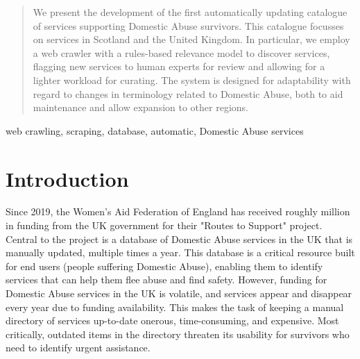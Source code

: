 \documentclass[conference]{IEEEtran}
\begin{document}

\maketitle

\begin{abstract}
We present the development of the first automatically updating catalogue of services supporting Domestic Abuse survivors. 
This catalogue focusses on services in Scotland and the United Kingdom. 
In particular, we employ a web crawler with a rules-based relevance model to discover services, flagging new services to human experts for review and allowing for a lighter workload for curating.
The system is designed for adaptability with regard to changes in terminology related to Domestic Abuse, both to aid maintenance and allow expansion to other regions.
\end{abstract}

\begin{IEEEkeywords}
web crawling, scraping, database, automatic, Domestic Abuse services
\end{IEEEkeywords}

\section{Introduction}

Since 2019, the Women's Aid Federation of England has received roughly  million in funding from the UK government for their "Routes to Support" project\cite{wafin20, wafin21, wafin22}.
Central to the project is a database of Domestic Abuse services in the UK that is manually updated, multiple times a year. 
This database is a critical resource built for end users (people suffering Domestic Abuse), enabling them to identify services that can help them flee abuse and find safety. 
However, funding for Domestic Abuse services in the UK is volatile, and services appear and disappear every year due to funding availability. 
This makes the task of keeping a manual directory of services up-to-date onerous, time-consuming, and expensive. 
Most critically, outdated items in the directory threaten its usability for survivors who need to identify urgent assistance.
\end{document}
